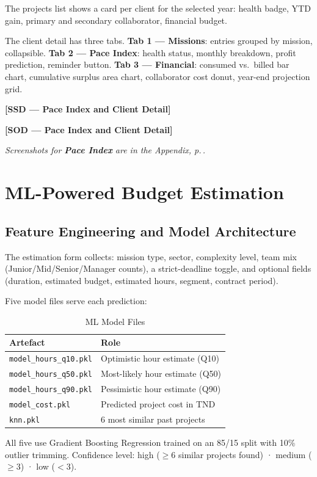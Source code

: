 \documentclass[12pt,a4paper]{report}
\newcommand{\ssd}[1]{\begin{placeholder}\textbf{[SSD --- #1]}\end{placeholder}\vspace{2pt}}
\newcommand{\sod}[1]{\begin{placeholder}\textbf{[SOD --- #1]}\end{placeholder}\vspace{4pt}}
\newcommand{\annexref}[1]{\begin{screenshotbox}\small\textit{Screenshots for \textbf{#1} are in the Appendix, p.\,\pageref{annex:#1}.}\end{screenshotbox}\vspace{4pt}}
\begin{document}
The projects list shows a card per client for the selected year: health badge, YTD
gain, primary and secondary collaborator, financial budget.

The client detail has three tabs. \textbf{Tab 1 --- Missions}: entries grouped by
mission, collapsible. \textbf{Tab 2 --- Pace Index}: health status, monthly breakdown,
profit prediction, reminder button. \textbf{Tab 3 --- Financial}: consumed vs.\ billed
bar chart, cumulative surplus area chart, collaborator cost donut, year-end projection
grid.

\ssd{Pace Index and Client Detail}
\sod{Pace Index and Client Detail}
\annexref{Pace Index}

\section{ML-Powered Budget Estimation}

\subsection{Feature Engineering and Model Architecture}

The estimation form collects: mission type, sector, complexity level, team mix
(Junior/Mid/Senior/Manager counts), a strict-deadline toggle, and optional fields
(duration, estimated budget, estimated hours, segment, contract period).

Five model files serve each prediction:

\begin{longtable}{p{4cm} p{9cm}}
  \caption{ML Model Files}\label{tab:mlmodels}\\
  \toprule Artefact & Role\\\midrule\endhead
  \texttt{model\_hours\_q10.pkl} & Optimistic hour estimate (Q10)\\
  \texttt{model\_hours\_q50.pkl} & Most-likely hour estimate (Q50)\\
  \texttt{model\_hours\_q90.pkl} & Pessimistic hour estimate (Q90)\\
  \texttt{model\_cost.pkl}       & Predicted project cost in TND\\
  \texttt{knn.pkl}               & 6 most similar past projects\\
  \bottomrule
\end{longtable}

All five use Gradient Boosting Regression trained on an 85/15 split with 10\%
outlier trimming. Confidence level: high ($\geq$6 similar projects found) · medium
($\geq$3) · low ($<$3).
\end{document}
